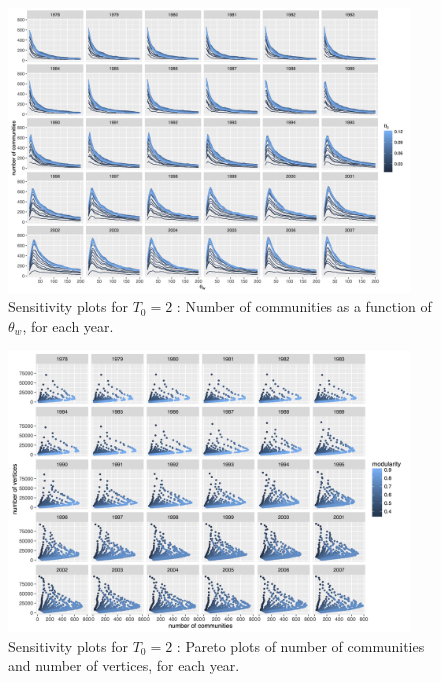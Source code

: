 \documentclass[article]{article}%
\begin{document}
\begin{figure}
	\centering
	\includegraphics[width=0.95\textwidth,height=\textwidth,angle=90]{figures/commnum_thetaw_byyears_window3.png}
	\caption{Sensitivity plots for $T_0 = 2$ : Number of communities as a function of $\theta_w$, for each year.}
	\label{fig:sensitivity-window3-1}
\end{figure}


\begin{figure}
	\centering
	\includegraphics[width=0.95\textwidth,height=\textwidth,angle=90]{figures/vcount_comnum_pareto_window3.png}
	\caption{Sensitivity plots for $T_0 = 2$ : Pareto plots of number of communities and number of vertices, for each year.}
	\label{fig:sensitivity-window3-2}
\end{figure}
\end{document}
